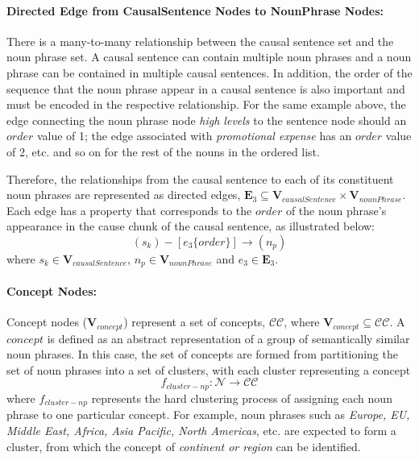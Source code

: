 \documentclass [
     12pt,         %
     a4paper,      %
     BCOR10mm,     %
     DIV14,        %
     liststotoc,   %
     bibtotoc,     %
     idxtotoc,     %
     parskip       %
     ]{scrreprt}
\begin{document}
\paragraph{Directed Edge from CausalSentence Nodes to NounPhrase Nodes:} There is a many-to-many relationship between the causal sentence set and the noun phrase set. A causal sentence can contain multiple noun phrases and a noun phrase can be contained in multiple causal sentences. In addition, the order of the sequence that the noun phrase appear in a causal sentence is also important and must be encoded in the respective relationship. For the same example above, the edge connecting the noun phrase node \emph{high levels} to the sentence node should an $order$ value of 1; the edge associated with \emph{promotional expense} has an $order$ value of 2, etc. and so on for the rest of the nouns in the ordered list. 

Therefore, the relationships from the causal sentence to each of its constituent noun phrases are represented as directed edges, $\mathbf{E}_3 \subseteq \mathbf{V}_{causalSentence} \times \mathbf{V}_{nounPhrase}$. Each edge has a property that corresponds to the $order$ of the noun phrase's appearance in the cause chunk of the causal sentence, as illustrated below:
\[( s_k ) - [ e_3 \{order\} ]\rightarrow ( n_p ) \] 
where $s_k \in \mathbf{V}_{causalSentence}$, $n_p \in \mathbf{V}_{nounPhrase}$ and $e_3 \in \mathbf{E}_3$.


\paragraph{Concept Nodes:} Concept nodes ($\mathbf{V}_{concept}$) represent a set of concepts, $\mathbf{\mathcal{CC}}$, where $\mathbf{V}_{concept} \subseteq \mathcal{CC}$. A $concept$ is defined as an abstract representation of a group of semantically similar noun phrases. In this case, the set of concepts are formed from partitioning the set of noun phrases into a set of clusters, with each cluster representing a concept
\[f_{cluster-np}: \mathbf{\mathcal{N}} \rightarrow \mathbf{\mathcal{CC}}\] 
where $f_{cluster-np}$ represents the hard clustering process of assigning each noun phrase to one particular concept. For example, noun phrases such as \emph{Europe, EU, Middle East, Africa, Asia Pacific, North Americas}, etc. are expected to form a cluster, from which the concept of \emph{continent or region} can be identified.  
\end{document}
